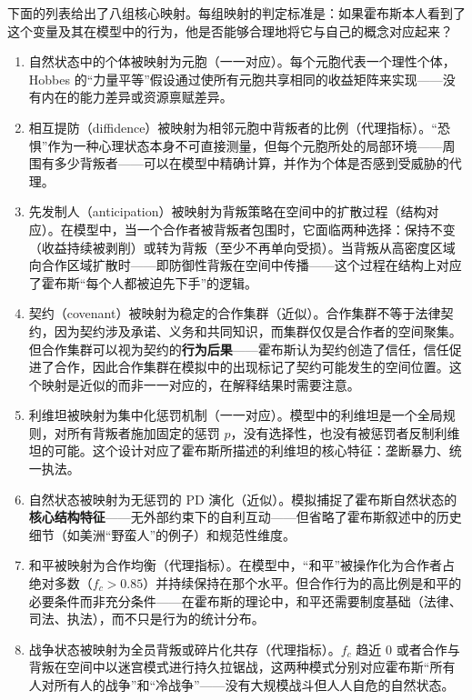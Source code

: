 \documentclass[12pt,a4paper]{ctexart}
\begin{document}
下面的列表给出了八组核心映射。每组映射的判定标准是：如果霍布斯本人看到了这个变量及其在模型中的行为，他是否能够合理地将它与自己的概念对应起来？

\begin{enumerate}
  \item 自然状态中的个体被映射为元胞（一一对应）。每个元胞代表一个理性个体，Hobbes 的“力量平等”假设通过使所有元胞共享相同的收益矩阵来实现——没有内在的能力差异或资源禀赋差异。

  \item 相互提防（diffidence）被映射为相邻元胞中背叛者的比例（代理指标）。“恐惧”作为一种心理状态本身不可直接测量，但每个元胞所处的局部环境——周围有多少背叛者——可以在模型中精确计算，并作为个体是否感到受威胁的代理。

  \item 先发制人（anticipation）被映射为背叛策略在空间中的扩散过程（结构对应）。在模型中，当一个合作者被背叛者包围时，它面临两种选择：保持不变（收益持续被剥削）或转为背叛（至少不再单向受损）。当背叛从高密度区域向合作区域扩散时——即防御性背叛在空间中传播——这个过程在结构上对应了霍布斯“每个人都被迫先下手”的逻辑。

  \item 契约（covenant）被映射为稳定的合作集群（近似）。合作集群不等于法律契约，因为契约涉及承诺、义务和共同知识，而集群仅仅是合作者的空间聚集。但合作集群可以视为契约的\textbf{行为后果}——霍布斯认为契约创造了信任，信任促进了合作，因此合作集群在模拟中的出现标记了契约可能发生的空间位置。这个映射是近似的而非一一对应的，在解释结果时需要注意。

  \item 利维坦被映射为集中化惩罚机制（一一对应）。模型中的利维坦是一个全局规则，对所有背叛者施加固定的惩罚 $p$，没有选择性，也没有被惩罚者反制利维坦的可能。这个设计对应了霍布斯所描述的利维坦的核心特征：垄断暴力、统一执法。

  \item 自然状态被映射为无惩罚的 PD 演化（近似）。模拟捕捉了霍布斯自然状态的\textbf{核心结构特征}——无外部约束下的自利互动——但省略了霍布斯叙述中的历史细节（如美洲“野蛮人”的例子）和规范性维度。

  \item 和平被映射为合作均衡（代理指标）。在模型中，“和平”被操作化为合作者占绝对多数（$f_c > 0.85$）并持续保持在那个水平。但合作行为的高比例是和平的必要条件而非充分条件——在霍布斯的理论中，和平还需要制度基础（法律、司法、执法），而不只是行为的统计分布。

  \item 战争状态被映射为全员背叛或碎片化共存（代理指标）。$f_c$ 趋近 0 或者合作与背叛在空间中以迷宫模式进行持久拉锯战，这两种模式分别对应霍布斯“所有人对所有人的战争”和“冷战争”——没有大规模战斗但人人自危的自然状态。
\end{enumerate}
\end{document}
